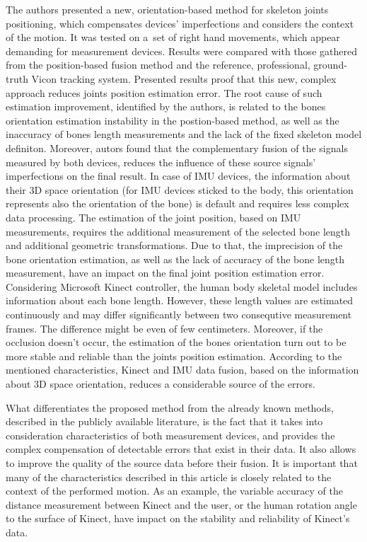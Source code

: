 \documentclass[sensors,article,submit,moreauthors,pdftex,10pt,a4paper]{mdpi}
\begin{document}
	The authors presented a new, orientation-based method for skeleton joints positioning, which compensates devices' imperfections and considers the context of the motion. It was tested on a~set of right hand movements, which appear demanding for measurement devices. Results were compared with those gathered from the position-based fusion method and the reference, professional, ground-truth Vicon tracking system. Presented results proof that this new, complex approach reduces joints position estimation error. The root cause of such estimation improvement, identified by the authors, is related to the bones orientation estimation instability in the postion-based method, as well as the inaccuracy of bones length measurements and the lack of the fixed skeleton model definiton. Moreover, autors found that the complementary fusion of the signals measured by both devices, reduces the influence of these source signals' imperfections on the final result.
	In case of IMU devices, the information about their 3D space orientation (for IMU devices sticked to the body, this orientation represents also the orientation of the bone) is default and requires less complex data processing. The estimation of the joint position, based on IMU measurements, requires the additional measurement of the selected bone length and additional geometric transformations. Due to that, the imprecision of the bone orientation estimation, as well as the lack of accuracy of the bone length measurement, have an impact on the final joint position estimation error.
	Considering Microsoft Kinect controller, the human body skeletal model includes information about each bone length. However, these length values are estimated continuously and may differ significantly between two consequtive measurement frames. The difference might be even of few centimeters. Moreover, if the occlusion doesn't occur, the estimation of the bones orientation turn out to be more stable and reliable than the joints position estimation. 
	According to the mentioned characteristics, Kinect and IMU data fusion, based on the information about 3D space orientation, reduces a considerable source of the errors.

	What differentiates the proposed method from the already known methods, described in the publicly available literature, is the fact that it takes into consideration characteristics of both measurement devices, and provides the complex compensation of detectable errors that exist in their data. It also allows to improve the quality of the source data before their fusion. It is important that many of the characteristics described in this article is closely related to the context of the performed motion. As an example, the variable accuracy of the distance measurement between Kinect and the user, or the human rotation angle to the surface of Kinect, have impact on the stability and reliability of Kinect's data.
	
\end{document}
